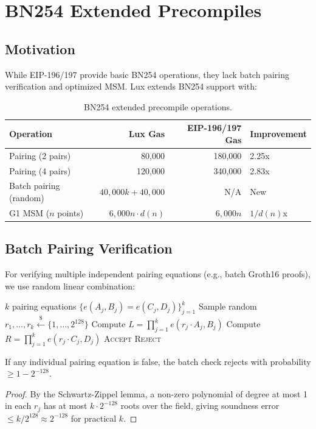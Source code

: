 \section{BN254 Extended Precompiles}
\label{sec:bn254}

\subsection{Motivation}

While EIP-196/197 provide basic BN254 operations, they lack batch pairing verification and optimized MSM. Lux extends BN254 support with:

\begin{table}[H]
\centering
\caption{BN254 extended precompile operations.}
\label{tab:bn254}
\begin{tabular}{lrrl}
\toprule
\textbf{Operation} & \textbf{Lux Gas} & \textbf{EIP-196/197 Gas} & \textbf{Improvement} \\
\midrule
Pairing (2 pairs) & 80,000 & 180,000 & 2.25x \\
Pairing (4 pairs) & 120,000 & 340,000 & 2.83x \\
Batch pairing (random) & $40{,}000k + 40{,}000$ & N/A & New \\
G1 MSM ($n$ points) & $6{,}000n \cdot d(n)$ & $6{,}000n$ & $1/d(n)$x \\
\bottomrule
\end{tabular}
\end{table}

\subsection{Batch Pairing Verification}

For verifying multiple independent pairing equations (e.g., batch Groth16 proofs), we use random linear combination:

\begin{algorithm}[H]
\caption{Batch Pairing Verification}
\label{alg:batch_pairing}
\begin{algorithmic}[1]
\Require $k$ pairing equations $\{e(A_j, B_j) = e(C_j, D_j)\}_{j=1}^k$
\State Sample random $r_1, \ldots, r_k \xleftarrow{\$} \{1, \ldots, 2^{128}\}$
\State Compute $L = \prod_{j=1}^k e(r_j \cdot A_j, B_j)$
\State Compute $R = \prod_{j=1}^k e(r_j \cdot C_j, D_j)$
    \State \Return \textsc{Accept}
\Else
    \State \Return \textsc{Reject}
\EndIf
\end{algorithmic}
\end{algorithm}

\begin{theorem}
If any individual pairing equation is false, the batch check rejects with probability $\geq 1 - 2^{-128}$.
\end{theorem}

\begin{proof}
By the Schwartz-Zippel lemma, a non-zero polynomial of degree at most 1 in each $r_j$ has at most $k \cdot 2^{-128}$ roots over the field, giving soundness error $\leq k / 2^{128} \approx 2^{-128}$ for practical $k$.
\end{proof}

